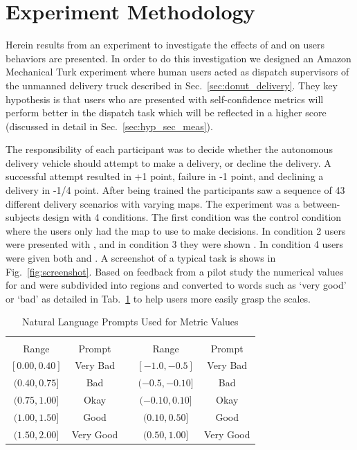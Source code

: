 \section{Experiment Methodology} \label{sec:methodology}
    Herein results from an experiment to investigate the effects of \xQ{} and \xO{} on users behaviors are presented. In order to do this investigation we designed an Amazon Mechanical Turk experiment where human users acted as dispatch supervisors of the unmanned delivery truck described in Sec.~\ref{sec:donut_delivery}. They key hypothesis is that users who are presented with self-confidence metrics will perform better in the dispatch task which will be reflected in a higher score (discussed in detail in Sec.~\ref{sec:hyp_sec_meas}).

    The responsibility of each participant was to decide whether the autonomous delivery vehicle should attempt to make a delivery, or decline the delivery. A successful attempt resulted in +1 point, failure in -1 point, and declining a delivery in -1/4 point. After being trained the participants saw a sequence of 43 different delivery scenarios with varying maps. The experiment was a between-subjects design with 4 conditions. The first condition was the control condition where the users only had the map to use to make decisions. In condition 2 users were presented with \xQ{}, and in condition 3 they were shown \xO. In condition 4 users were given both \xQ{} and \xO. A screenshot of a typical task is shows in Fig.~\ref{fig:screenshot}. Based on feedback from a pilot study the numerical values for \xQ{} and \xP{} were subdivided into regions and converted to words such as `very good' or `bad' as detailed in Tab.~\ref{tab:word_ranges} to help users more easily grasp the scales.

    \begin{table}[]
        \caption{Natural Language Prompts Used for Metric Values}
        \label{tab:word_ranges}
        \begin{tabular}{cclcc}
            \multicolumn{2}{c}{\xQ{}} & \vline & \multicolumn{2}{c}{\xO{}} \\
            Range & Prompt & \vline & Range & Prompt \\
            \hline
            $[0.00,0.40]$ & Very Bad & \vline & $[-1.0,-0.5]$ & Very Bad \\
            $(0.40,0.75]$ & Bad & \vline & $(-0.5,-0.10]$ & Bad \\
            $(0.75,1.00]$ & Okay & \vline & $(-0.10,0.10]$ & Okay \\
            $(1.00,1.50]$ & Good & \vline & $(0.10,0.50]$ & Good \\
            $(1.50,2.00]$ & Very Good & \vline & $(0.50,1.00]$ & Very Good
        \end{tabular}
    \end{table}

